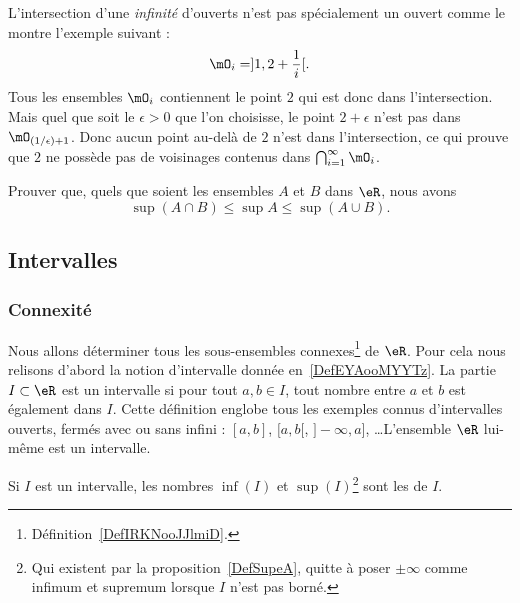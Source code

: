 \begin{remark}
L'intersection d'une \emph{infinité} d'ouverts n'est pas spécialement un ouvert comme le montre l'exemple suivant :
\[
  \mO_i=]1,2+\frac{ 1 }{ i }[.
\]
Tous les ensembles $\mO_i$ contiennent le point $2$ qui est donc dans l'intersection. Mais quel que soit le $\epsilon>0$ que l'on choisisse, le point $2+\epsilon$ n'est pas dans $\mO_{(1/\epsilon)+1}$. Donc aucun point au-delà de $2$ n'est dans l'intersection, ce qui prouve que $2$ ne possède pas de voisinages contenus dans $\bigcap_{i=1}^{\infty}\mO_i$.
\end{remark}

\begin{proposition}
Prouver que, quels que soient les ensembles $A$ et $B$ dans $\eR$, nous avons
\[
  \sup(A\cap B)\leq\sup A\leq\sup(A\cup B).
\]
\end{proposition}

\subsection{Intervalles}

\subsubsection{Connexité}

Nous allons déterminer tous les sous-ensembles connexes\footnote{Définition~\ref{DefIRKNooJJlmiD}.} de $\eR$. Pour cela nous relisons d'abord la notion d'intervalle donnée en~\ref{DefEYAooMYYTz}. La partie \( I\subset \eR\) est un intervalle si pour tout \( a,b\in I\), tout nombre entre \( a\) et \( b\) est également dans \( I\). Cette définition englobe tous les exemples connus d'intervalles ouverts, fermés avec ou sans infini : $[a,b]$, $[a,b[$, $]-\infty,a]$, \ldots L'ensemble \( \eR\) lui-même est un intervalle.

Si \( I\) est un intervalle, les nombres \( \inf(I)\) et \( \sup(I)\)\footnote{Qui existent par la proposition~\ref{DefSupeA}, quitte à poser \( \pm\infty\) comme infimum et supremum lorsque \( I\) n'est pas borné.} sont les  de \( I\).

